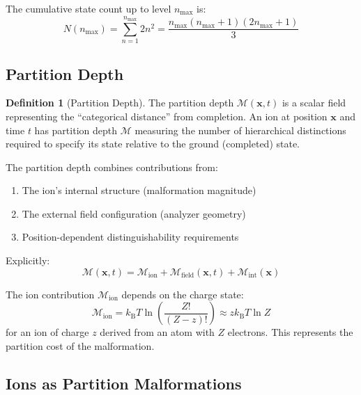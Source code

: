 \documentclass[twocolumn,10pt,a4paper]{article}
\theoremstyle{definition}
\newtheorem{definition}[theorem]{Definition}
\theoremstyle{remark}
\newcommand{\kB}{k_{\mathrm{B}}}
\newcommand{\Mdepth}{\mathcal{M}}
\begin{document}
The cumulative state count up to level $n_{\max}$ is:
\begin{equation}
    N(n_{\max}) = \sum_{n=1}^{n_{\max}} 2n^2 = \frac{n_{\max}(n_{\max}+1)(2n_{\max}+1)}{3}
    \label{eq:cumulative_states}
\end{equation}

\subsection{Partition Depth}

\begin{definition}[Partition Depth]
\label{def:partition_depth}
The partition depth $\Mdepth(\mathbf{x}, t)$ is a scalar field representing the ``categorical distance'' from completion. An ion at position $\mathbf{x}$ and time $t$ has partition depth $\Mdepth$ measuring the number of hierarchical distinctions required to specify its state relative to the ground (completed) state.
\end{definition}

The partition depth combines contributions from:
\begin{enumerate}
    \item The ion's internal structure (malformation magnitude)
    \item The external field configuration (analyzer geometry)
    \item Position-dependent distinguishability requirements
\end{enumerate}

Explicitly:
\begin{equation}
    \Mdepth(\mathbf{x}, t) = \Mdepth_{\mathrm{ion}} + \Mdepth_{\mathrm{field}}(\mathbf{x}, t) + \Mdepth_{\mathrm{int}}(\mathbf{x})
    \label{eq:partition_depth_total}
\end{equation}

The ion contribution $\Mdepth_{\mathrm{ion}}$ depends on the charge state:
\begin{equation}
    \Mdepth_{\mathrm{ion}} = \kB T \ln\left(\frac{Z!}{(Z-z)!}\right) \approx z \kB T \ln Z
    \label{eq:ion_depth}
\end{equation}
for an ion of charge $z$ derived from an atom with $Z$ electrons. This represents the partition cost of the malformation.

\subsection{Ions as Partition Malformations}
\end{document}
